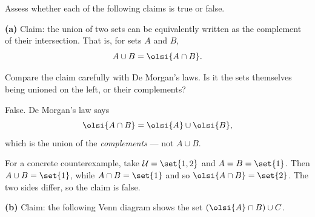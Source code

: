 \documentclass[12pt]{ximera}
\begin{document}
\begin{problem}
Assess whether each of the following claims is true or false.

\begin{prompt}
\textbf{(a)} Claim: the union of two sets can be equivalently written as the
complement of their intersection. That is, for sets $A$ and $B$,
\[ A\cup B = \olsi{A\cap B}. \]

\begin{multipleChoice}
\end{multipleChoice}

\begin{hint}
Compare the claim carefully with De Morgan's laws. Is it the sets themselves being
unioned on the left, or their complements?
\end{hint}

\begin{feedback}
False. De Morgan's law says
\[ \olsi{A\cap B} = \olsi{A}\cup\olsi{B}, \]
which is the union of the \emph{complements} --- not $A\cup B$.

For a concrete counterexample, take $\mathcal{U}=\set{1,2}$ and $A=B=\set{1}$. Then
$A\cup B=\set{1}$, while $A\cap B=\set{1}$ and so $\olsi{A\cap B}=\set{2}$. The two
sides differ, so the claim is false.
\end{feedback}
\end{prompt}

\begin{prompt}
\textbf{(b)} Claim: the following Venn diagram shows the set
$\left(\olsi{A}\cap B\right)\cup C$.

\begin{center}
\end{center}

\begin{multipleChoice}
\end{multipleChoice}


\end{prompt}
\end{problem}
\end{document}
